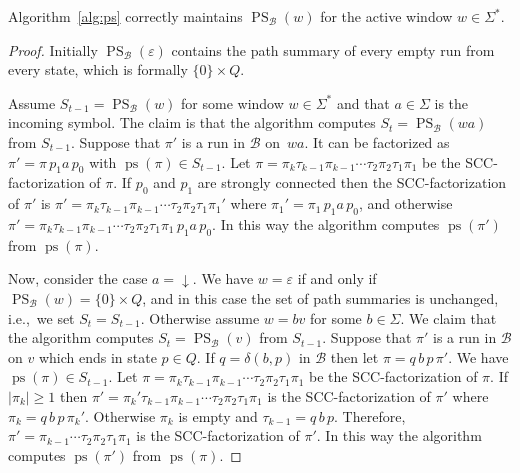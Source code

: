 \documentclass{theoretics}
\newcommand{\B}{\mathcal{B}}
\DeclareMathOperator{\ps}{ps}
\DeclareMathOperator{\PS}{PS}
\newcommand{\eps}{\varepsilon}
\renewcommand{\geq}{\geqslant}
\renewcommand{\ge}{\geq}
\begin{document}
\begin{lemma}
\label{lem:ps}
	Algorithm~\ref{alg:ps} correctly maintains $\PS_\B(w)$ for the active window $w \in \Sigma^*$.
\end{lemma}

\begin{proof}
	Initially $\PS_\B(\eps)$ contains the path summary of every empty run from every state,
	which is formally $\{0\} \times Q$.
	
	Assume $S_{t-1} = \PS_\B(w)$ for some window $w \in \Sigma^*$ and that $a \in \Sigma$ is the incoming symbol.
	The claim is that the algorithm computes $S_t = \PS_\B(wa)$ from $S_{t-1}$.
	Suppose that $\pi'$ is a run in $\B$ on~$wa$.
	It can be factorized as $\pi' = \pi \, p_1 a \, p_0$ with $\ps(\pi) \in S_{t-1}$.
	Let $\pi = \pi_k \tau_{k-1}  \pi_{k-1} \cdots \tau_2 \pi_2 \tau_1 \pi_1$ be the SCC-factorization of $\pi$.
	If $p_0$ and $p_1$ are strongly connected then the SCC-factorization
	of $\pi'$ is $\pi' = \pi_k \tau_{k-1}  \pi_{k-1} \cdots \tau_2 \pi_2 \tau_1 \pi_1'$
	where $\pi_1' = \pi_1 \, p_1 a \, p_0$, and otherwise
	$\pi' = \pi_k \tau_{k-1}  \pi_{k-1} \cdots \tau_2 \pi_2 \tau_1 \pi_1 \, p_1 a \, p_0$.
	In this way the algorithm computes $\ps(\pi')$ from $\ps(\pi)$.
	
	Now, consider the case $a = {\downarrow}$.
	We have $w = \eps$ if and only if $\PS_\B(w) = \{0\} \times Q$,
	and in this case the set of path summaries  is unchanged, i.e.,~we set $S_t = S_{t-1}$.
	Otherwise assume $w = bv$ for some $b \in \Sigma$.
	We claim that the algorithm computes $S_t = \PS_\B(v)$ from $S_{t-1}$.
	Suppose that $\pi'$ is a run in $\B$ on $v$ which ends in state $p \in Q$.
	If $q = \delta(b,p)$ in $\B$ then let $\pi = q \, b \, p \, \pi'$. We have $\ps(\pi) \in S_{t-1}$.
	Let $\pi = \pi_k \tau_{k-1}  \pi_{k-1} \cdots \tau_2 \pi_2 \tau_1 \pi_1$ be the SCC-factorization of $\pi$.
	If $|\pi_k| \ge 1$ then $\pi' = \pi_k' \tau_{k-1}  \pi_{k-1} \cdots \tau_2 \pi_2 \tau_1 \pi_1$ 
	is the SCC-factorization of $\pi'$ where $\pi_k = q \, b \, p \, \pi_k'$.
	Otherwise $\pi_k$ is empty and $\tau_{k-1} = q \, b \, p$.
	Therefore, $\pi' = \pi_{k-1} \cdots \tau_2 \pi_2 \tau_1 \pi_1$ is the SCC-factorization of $\pi'$.
	In this way the algorithm computes $\ps(\pi')$ from $\ps(\pi)$.
\end{proof}
\end{document}
